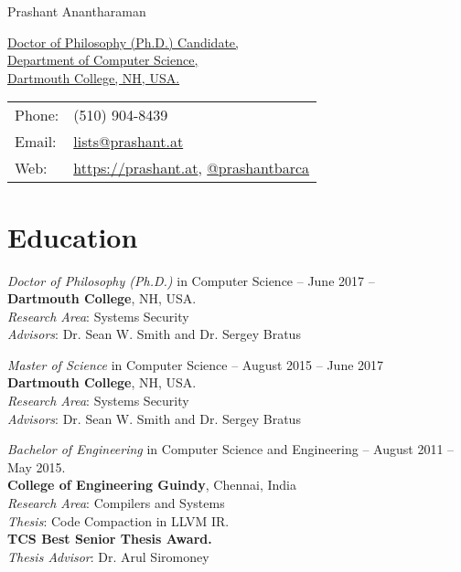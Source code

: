 \documentclass[letterpaper,10pt]{article}
\def\name{Prashant Anantharaman}
\renewenvironment{itemize}{
	\begin{list}{}{
			\setlength{\leftmargin}{1.5em}
		}
	}{
	\end{list}
}
\begin{document}
{\huge \name}


\vspace{0.25in}

\begin{minipage}{0.55\linewidth}
	\href{}{Doctor of Philosophy (Ph.D.) Candidate,}\\
	\href{}{Department of Computer Science,}\\
	\href{}{Dartmouth College, NH, USA.}\\
\end{minipage}
\begin{minipage}{0.35\linewidth}
	\begin{tabular}{ll}
		Phone: & (510) 904-8439 \\
		Email: & \href{mailto:lists@prashant}{lists@prashant.at} \\
		Web: & \href{https://prashant.at}{https://prashant.at}, \href{http://www.twitter.com/prashantbarca/}{@prashantbarca} \\
	\end{tabular}
\end{minipage}

\section*{Education}
\begin{itemize}
	\setlength\itemsep{0.5ex}
	\item \textit{Doctor of Philosophy (Ph.D.)} in Computer Science --  June 2017 -- \\\textbf{Dartmouth College}, NH, USA.\\
		\textit{Research Area}: Systems Security\\
		\textit{Advisors}: Dr. Sean W. Smith and Dr. Sergey Bratus
	\item \textit{Master of Science} in Computer Science -- August 2015 -- June 2017\\\textbf{Dartmouth College}, NH, USA.\\
		\textit{Research Area}: Systems Security\\
		\textit{Advisors}: Dr. Sean W. Smith and Dr. Sergey Bratus
	\item \textit{Bachelor of Engineering} in Computer Science and Engineering -- August 2011 -- May 2015.\\ \textbf{College of Engineering Guindy}, Chennai, India\\
		\textit{Research Area}: Compilers and Systems\\
		\textit{Thesis}: Code Compaction in LLVM IR.\\
		\textbf{TCS Best Senior Thesis Award.}\\
		\textit{Thesis Advisor}: Dr. Arul Siromoney
\end{itemize}
\end{document}
